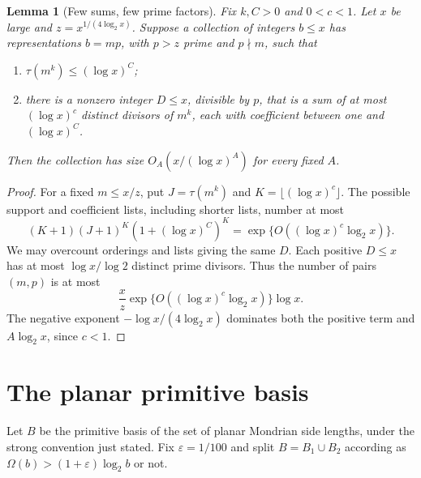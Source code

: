 \documentclass[11pt,a4paper]{article}
\newtheorem{lemma}[theorem]{Lemma}
\newcommand{\Om}{\Omega}
\begin{document}
\begin{lemma}[Few sums, few prime factors]\label{count}
Fix $k,C>0$ and $0<c<1$. Let $x$ be large and
$z=x^{1/(4\log_2x)}$. Suppose a collection of integers $b\le x$ has
representations $b=mp$, with $p>z$ prime and $p\nmid m$, such that
\begin{enumerate}
\item $\tau(m^k)\le(\log x)^C$;
\item there is a nonzero integer $D\le x$, divisible by $p$, that is
      a sum of at most $(\log x)^c$ distinct divisors of $m^k$, each
      with coefficient between one and $(\log x)^C$.
\end{enumerate}
Then the collection has size $O_A(x/(\log x)^A)$ for every fixed $A$.
\end{lemma}
\begin{proof}
For a fixed $m\le x/z$, put $J=\tau(m^k)$ and
$K=\lfloor(\log x)^c\rfloor$. The possible support and coefficient
lists, including shorter lists, number at most
\[
 (K+1)(J+1)^K(1+(\log x)^C)^K
 =\exp\{O((\log x)^c\log_2x)\}.
\]
We may overcount orderings and lists giving the same $D$. Each positive
$D\le x$ has at most $\log x/\log2$ distinct prime divisors. Thus the
number of pairs $(m,p)$ is at most
\[
 \frac{x}{z}\exp\{O((\log x)^c\log_2x)\}\log x.
\]
The negative exponent $-\log x/(4\log_2x)$ dominates both the positive
term and $A\log_2x$, since $c<1$.
\end{proof}

\section{The planar primitive basis}
Let $B$ be the primitive basis of the set of planar Mondrian side
lengths, under the strong convention just stated. Fix
$\varepsilon=1/100$ and split $B=B_1\cup B_2$ according as
$\Om(b)>(1+\varepsilon)\log_2b$ or not.
\end{document}
